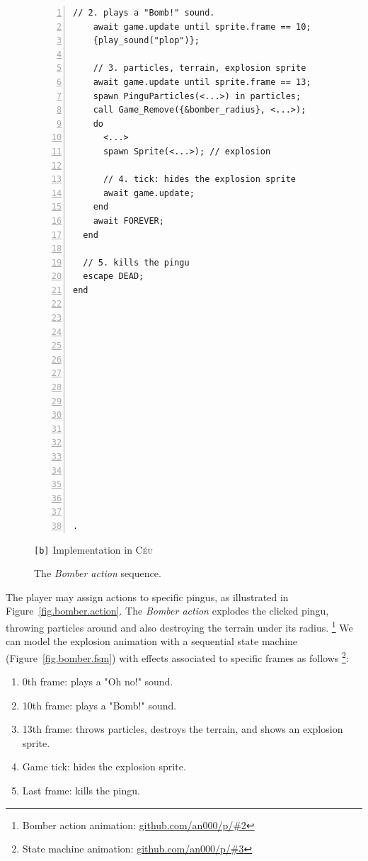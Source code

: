 \documentclass{vgtc}                          %
\newcommand{\CEU}{\textsc{C\'{e}u}\xspace}
\newcommand{\code}[1] {{\small{\texttt{#1}}}}
\newcommand{\bx}{\code{[b]}\xspace}
\begin{document}
\begin{figure}[!t]
\begin{minipage}[t]{0.50\linewidth}
\begin{lstlisting}[numbers=left,xleftmargin=3em]
    // 2. plays a "Bomb!" sound.
    await game.update until sprite.frame == 10;
    {play_sound("plop")};

    // 3. particles, terrain, explosion sprite
    await game.update until sprite.frame == 13;
    spawn PinguParticles(<...>) in particles;
    call Game_Remove({&bomber_radius}, <...>);
    do
      <...>
      spawn Sprite(<...>); // explosion

      // 4. tick: hides the explosion sprite
      await game.update;
    end
    await FOREVER;
  end

  // 5. kills the pingu
  escape DEAD;
end
















.
\end{lstlisting}
\centering\small{\bx Implementation in \CEU}
\end{minipage}
\caption{ The \emph{Bomber action} sequence.
\label{lst.bomber}
}
\end{figure}

The player may assign actions to specific pingus, as illustrated in
Figure~\ref{fig.bomber.action}.
%
The \emph{Bomber action} explodes the clicked pingu, throwing particles around
and also destroying the terrain under its radius.%
\footnote{Bomber action animation: \url{github.com/an000/p/#2} }
%
We can model the explosion animation with a sequential state machine
(Figure~\ref{fig.bomber.fsm}) with effects associated to specific frames as
follows%
\footnote{State machine animation: \url{github.com/an000/p/#3} }:
%
\begin{enumerate}
\item 0th frame:  plays a "Oh no!" sound.
\item 10th frame: plays a "Bomb!" sound.
\item 13th frame: throws particles, destroys the terrain, and shows an
                  explosion sprite.
\item Game tick:  hides the explosion sprite.
\item Last frame: kills the pingu.
\end{enumerate}
\end{document}
